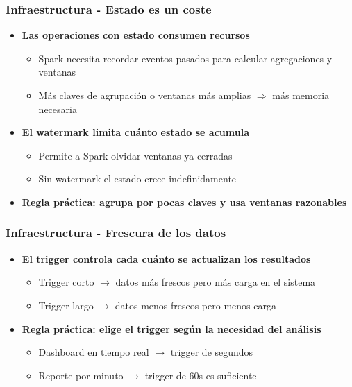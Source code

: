 \documentclass[aspectratio=169]{beamer}
\begin{document}
\begin{frame}\frametitle{Infraestructura - Estado es un coste}
\begin{itemize}
	\item \textbf{Las operaciones con estado consumen recursos}
	\begin{itemize}
		\item Spark necesita recordar eventos pasados para calcular agregaciones y ventanas
		\item Más claves de agrupación o ventanas más amplias $\Rightarrow$ más memoria necesaria
	\end{itemize}

	\vspace{1em}

	\item \textbf{El watermark limita cuánto estado se acumula}
	\begin{itemize}
		\item Permite a Spark olvidar ventanas ya cerradas
		\item Sin watermark el estado crece indefinidamente
	\end{itemize}

	\vspace{1em}

	\item \textbf{Regla práctica: agrupa por pocas claves y usa ventanas razonables}
\end{itemize}
\end{frame}

\begin{frame}\frametitle{Infraestructura - Frescura de los datos}
	\begin{itemize}
		\item \textbf{El trigger controla cada cuánto se actualizan los resultados}
		\begin{itemize}
			\item Trigger corto $\rightarrow$ datos más frescos pero más carga en el sistema
			\item Trigger largo $\rightarrow$ datos menos frescos pero menos carga
		\end{itemize}

		\vspace{1em}

		\item \textbf{Regla práctica: elige el trigger según la necesidad del análisis}
		\begin{itemize}
			\item Dashboard en tiempo real $\rightarrow$ trigger de segundos
			\item Reporte por minuto $\rightarrow$ trigger de 60s es suficiente
		\end{itemize}
	\end{itemize}
\end{frame}
\end{document}
